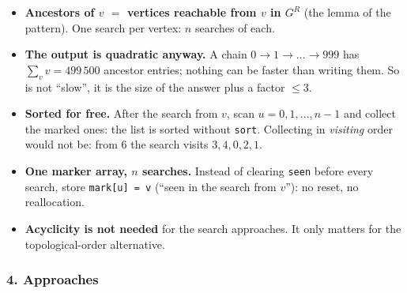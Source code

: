 \begin{itemize}[leftmargin=*]
    \item \textbf{Ancestors of $v$ $=$ vertices reachable from $v$ in $G^R$} (the lemma of the pattern). One search per vertex: $n$ searches of  each.
    \item \textbf{The output is quadratic anyway.} A chain $0 \to 1 \to \dots \to 999$ has $\sum_v v = 499\,500$ ancestor entries; nothing can be faster than writing them. So  is not ``slow'', it is the size of the answer plus a factor $\le 3$.
    \item \textbf{Sorted for free.} After the search from $v$, scan $u = 0, 1, \dots, n-1$ and collect the marked ones: the list is sorted without \texttt{sort}. Collecting in \emph{visiting} order would not be: from 6 the search visits $3, 4, 0, 2, 1$.
    \item \textbf{One marker array, $n$ searches.} Instead of clearing \texttt{seen} before every search, store \texttt{mark[u] = v} (``seen in the search from $v$''): no  reset, no reallocation.
    \item \textbf{Acyclicity is not needed} for the search approaches. It only matters for the topological-order alternative.
\end{itemize}

\subsubsection*{4. Approaches}

